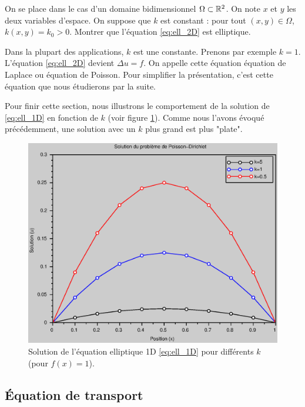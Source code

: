 \documentclass[12pt,a4paper,twoside]{article}
\begin{document}
\begin{exercise}
  On se place dans le cas d'un domaine bidimensionnel $\Omega \subset \mathbb{R}^2$.
  On note $x$ et $y$ les deux variables d'espace.
  On suppose que $k$ est constant : pour tout $(x,y) \in \Omega$,
  $k(x,y) = k_0 > 0$.
  Montrer que l'\'equation \eqref{eq:ell_2D} est elliptique.
\end{exercise}

\begin{remark}
  Dans la plupart des applications, $k$ est une constante.
  Prenons par exemple $k=1$.
  L'\'equation \eqref{eq:ell_2D} devient $\Delta u = f$.
  On appelle cette \'equation \'equation de Laplace ou 
  \'equation de Poisson.
  Pour simplifier la pr\'esentation, c'est cette \'equation que nous \'etudierons
  par la suite.
\end{remark}


Pour finir cette section, nous illustrons le comportement
de la solution de \eqref{eq:ell_1D} en fonction de $k$
(voir figure \ref{fig:ell_k}).
Comme nous l'avons \'evoqu\'e pr\'ec\'edemment, une solution avec 
un $k$ plus grand est plus "plate".


\begin{figure}[h]
  \centering
  \includegraphics[width = 12cm]{Figures/Poisson_k.eps}
  \caption{Solution de l'\'equation elliptique 1D \eqref{eq:ell_1D}
  pour diff\'erents $k$ (pour $f(x)=1$).}
  \label{fig:ell_k}
\end{figure}


\subsection{\'Equation de transport}
\end{document}
